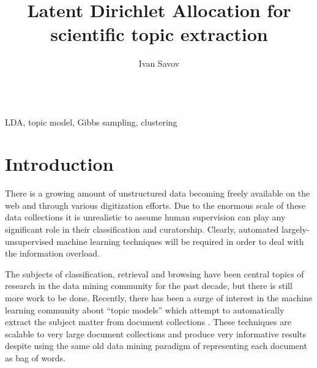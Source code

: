 \documentclass[11pt]{article}
\author{Ivan Savov}
\title{ {\LARGE Latent Dirichlet Allocation for \\ scientific topic extraction } }
\begin{document}
\maketitle


\ \\
 LDA, topic model, Gibbs sampling, clustering 


\section{Introduction}

    There is a growing amount of unstructured data becoming freely available on the web and
    through various digitization efforts.
    Due to the enormous scale of these data collections it is unrealistic to assume human
    supervision can play any significant role in their classification and curatorship.
    Clearly, automated largely-unsupervised machine learning techniques will be required
    in order to deal with the information overload.

    The subjects of classification, retrieval and browsing have been central topics of research
    in the data mining community for the past decade, but there is still more work to be done.
    Recently, there has been a surge of interest in the machine learning community about
    ``topic models'' which attempt to automatically extract the subject matter from
    document collections \cite{Blei2003,Blei2009}.
    These techniques are scalable to very large document collections and produce very informative
    results despite using the same old data mining paradigm of representing each document as bag of words.
\end{document}
